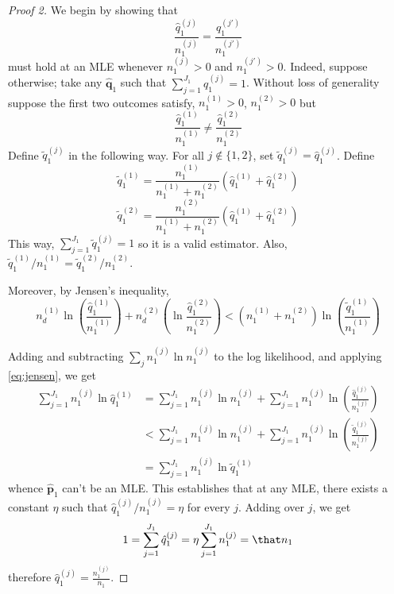 \documentclass[11pt]{article} %
\begin{document}
\begin{proof}[Proof 2] We begin by showing that
  \[  \frac{\hat q_1^{(j)}}{n_1^{(j)}} = \frac{\hat q_1^{(j')}}{n_1^{(j')}} \]
  must hold at an MLE whenever $n_1^{(j)} >0$ and $n_1^{(j')} >0$.
  Indeed, suppose otherwise; take any $\hat{\mathbf q}_1$ such that
  $\sum_{j=1}^{J_1} q_1^{(j)} = 1$. Without loss of generality suppose the first
  two outcomes satisfy, $n_1^{(1)} > 0$, $n_1^{(2)}>0$ but
  \[\frac{\hat q_1^{(1)}}{n_1^{(1)}} \ne \frac{\hat q_1^{(2)}}{n_1^{(2)}}\]
  Define $\tilde q_1^{(j)}$ in the following way. For all $j \notin \{1,2\}$,
  set $\tilde q_1^{(j)} = \hat q_1^{(j)}$.  Define
  \[  \tilde q_1^{(1)} = \frac{n_1^{(1)}}{n_1^{(1)}+ n_1^{(2)}} \left(\hat q_1^{(1)} + \hat q_1^{(2)}\right)\]
  \[  \tilde q_1^{(2)} = \frac{n_1^{(2)}}{n_1^{(1)}+ n_1^{(2)}} \left(\hat q_1^{(1)} + \hat q_1^{(2)}\right)\]
  This way, $\sum_{j=1}^{J_1} \tilde q_1^{(j)} = 1$ so it is a valid estimator.
  Also, $\tilde q_1^{(1)} / n_1^{(1)} = \tilde q_1^{(2)}/n_1^{(2)}$.

  Moreover, by Jensen's inequality,
  \begin{equation}
    \label{eq:jensen}
    n_d^{(1)} \ln \left(\frac{\hat q_1^{(1)}}{n_1^{(1)}}\right) + n_d^{(2)} \left(\ln
      \frac{\hat q_1^{(2)} }{n_1^{(2)}}\right) < (n_1^{(1)} + n_1^{(2)}) \ln \left(
      \frac{\tilde q_1^{(1)}}{n_1^{(1)}}  \right)     
  \end{equation}

  Adding and subtracting $\sum_j n_1^{(j)}\ln n_1^{(j)}$ to the log likelihood,
  and applying \eqref{eq:jensen}, we get
  \[  \begin{aligned} \sum_{j=1}^{J_1} n_1^{(j)} \ln \hat q_1^{(1)} &= \sum_{j=1}^{J_1}
    n_1^{(j)} \ln n_1^{(j)} + \sum_{j=1}^{J_1} n_1^{(j)} \ln \left( \frac{\hat
        q_1^{(j)}}{n_1^{(j)}} \right) \\
    & < \sum_{j=1}^{J_1}
    n_1^{(j)} \ln n_1^{(j)} + \sum_{j=1}^{J_1} n_1^{(j)} \ln \left( \frac{\tilde
        q_1^{(j)}}{n_1^{(j)}} \right)\\
    &= \sum_{j=1}^{J_1} n_1^{(j)} \ln \tilde q_1^{(1)}
  \end{aligned}\]
  whence $\hat{\mathbf p}_1$ can't be an MLE. This establishes that at any MLE,
  there exists a constant $\eta$ such that $\hat q_1^{(j)} / n_1^{(j)}= \eta$ for every
  $j$. Adding over $j$, we get
  \[  1 = \sum_{j=1}^{J_1} \hat q_1^{(j)} = \eta \sum_{j=1}^{J_1} n_1^{(j)} = \that n_1 \]
  therefore $\hat q_1^{(j)} = \frac{n_1^{(j)}}{n_1}$.
\end{proof}
\end{document}
